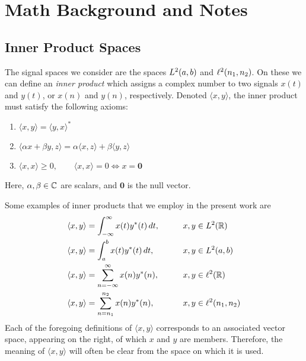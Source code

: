 \section{Math Background and Notes}
{\subsection{Inner Product Spaces\protect\footnotemark}
}
The signal spaces we consider are the spaces $L^2(a,b)$ and
$\ell^2(n_1,n_2)$.  On these we can define an {\it inner product} which 
assigns a complex number to two signals $x(t)$ and $y(t)$, or  
$x(n)$ and $y(n)$, respectively.  Denoted 
$\langle x,y\rangle$,
the inner product must satisfy the following axioms:
\begin{enumerate}
\item $\langle x,y\rangle = \langle y,x\rangle^*$
\item $\langle \alpha x + \beta y, z\rangle =
  \alpha\langle x,z\rangle +\beta\langle y,z\rangle$ 
\item $\langle x,x\rangle \geq 0, \qquad \langle x,x\rangle = 0 \Leftrightarrow x = \mathbf{0}$
\end{enumerate}
Here, $\alpha, \beta \in \mathbb{C}$ are scalars, and $\mathbf{0}$ is the null vector.

Some examples of inner products that we employ in the present work are
\begin{alignat*}{2}
\langle x,y\rangle &= \int_{-\infty}^{\infty} x(t)y^*(t)\,dt, && \qquad x,y\in L^2(\mathbb{R}) \\
\langle x,y\rangle &= \int_{a}^{b} x(t)y^*(t)\,dt, && \qquad x,y\in L^2(a,b) \\
\langle x,y\rangle &= \sum_{n=-\infty}^{\infty} x(n)y^*(n), && \qquad x,y\in \ell^2(\mathbb{R}) \\
\langle x,y\rangle &= \sum_{n=n_1}^{n_2} x(n)y^*(n), && \qquad x,y\in\ell^2(n_1,n_2)
\end{alignat*}
Each of the foregoing definitions of $\langle x,y\rangle$ corresponds to an
associated vector space, appearing on the right, of which $x$ and $y$ are members.  Therefore,
the meaning of $\langle x,y\rangle$ will often be clear from the space on which it is used.

